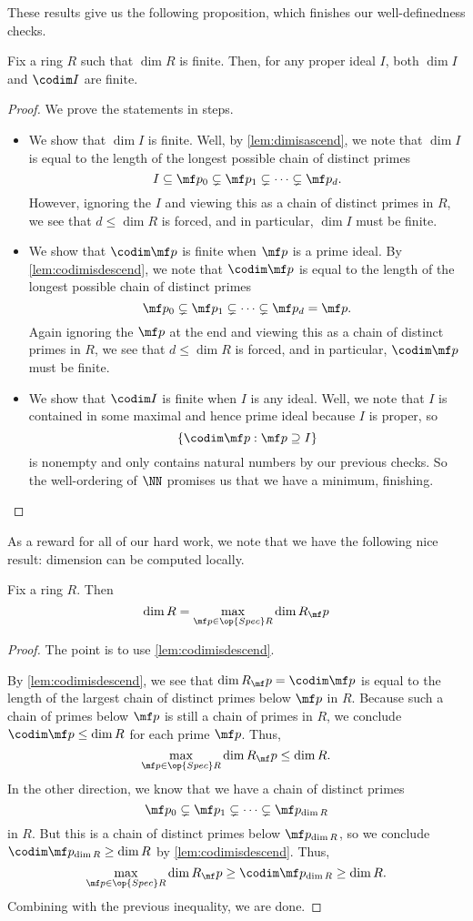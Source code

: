 These results give us the following proposition, which finishes our well-definedness checks.
\begin{prop}
	Fix a ring $R$ such that $\dim R$ is finite. Then, for any proper ideal $I$, both $\dim I$ and $\codim I$ are finite.
\end{prop}
\begin{proof}
	We prove the statements in steps.
	\begin{itemize}
		\item We show that $\dim I$ is finite. Well, by \autoref{lem:dimisascend}, we note that $\dim I$ is equal to the length of the longest possible chain of distinct primes
		\[I\subseteq\mf p_0\subsetneq\mf p_1\subsetneq\cdots\subsetneq\mf p_d.\]
		However, ignoring the $I$ and viewing this as a chain of distinct primes in $R$, we see that $d\le\dim R$ is forced, and in particular, $\dim I$ must be finite.
		\item We show that $\codim\mf p$ is finite when $\mf p$ is a prime ideal. By \autoref{lem:codimisdescend}, we note that $\codim\mf p$ is equal to the length of the longest possible chain of distinct primes
		\[\mf p_0\subsetneq\mf p_1\subsetneq\cdots\subsetneq\mf p_d=\mf p.\]
		Again ignoring the $\mf p$ at the end and viewing this as a chain of distinct primes in $R$, we see that $d\le\dim R$ is forced, and in particular, $\codim\mf p$ must be finite.
		\item We show that $\codim I$ is finite when $I$ is any ideal. Well, we note that $I$ is contained in some maximal and hence prime ideal because $I$ is proper, so
		\[\{\codim\mf p:\mf p\supseteq I\}\]
		is nonempty and only contains natural numbers by our previous checks. So the well-ordering of $\NN$ promises us that we have a minimum, finishing.
		\qedhere
	\end{itemize}
\end{proof}
As a reward for all of our hard work, we note that we have the following nice result: dimension can be computed locally.
\begin{theorem} \label{thm:dimislocal}
	Fix a ring $R$. Then
	\[\dim R=\max_{\mf p\in\op{Spec}R}\dim R_\mf p\]
\end{theorem}
\begin{proof}
	The point is to use \autoref{lem:codimisdescend}.
	
	By \autoref{lem:codimisdescend}, we see that $\dim R_\mf p=\codim\mf p$ is equal to the length of the largest chain of distinct primes below $\mf p$ in $R$. Because such a chain of primes below $\mf p$ is still a chain of primes in $R$, we conclude $\codim\mf p\le\dim R$ for each prime $\mf p$. Thus,
	\[\max_{\mf p\in\op{Spec}R}\dim R_\mf p\le\dim R.\]
	In the other direction, we know that we have a chain of distinct primes
	\[\mf p_0\subsetneq\mf p_1\subsetneq\cdots\subsetneq\mf p_{\dim R}\]
	in $R$. But this is a chain of distinct primes below $\mf p_{\dim R}$, so we conclude $\codim\mf p_{\dim R}\ge\dim R$ by \autoref{lem:codimisdescend}. Thus,
	\[\max_{\mf p\in\op{Spec}R}\dim R_\mf p\ge\codim\mf p_{\dim R}\ge\dim R.\]
	Combining with the previous inequality, we are done.
\end{proof}

